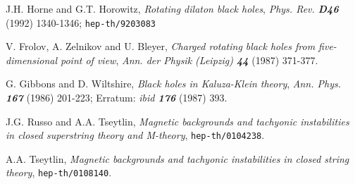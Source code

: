 \documentclass[a4paper,12pt]{article}
\begin{document}
\begin{thebibliography}{99}
    J.H. Horne and G.T. Horowitz,
    {\sl Rotating dilaton black holes},
    {\it Phys. Rev. \bf D46} (1992) 1340-1346;
    {\tt hep-th/9203083}

    V. Frolov, A. Zelnikov and U. Bleyer,
    {\sl Charged rotating black holes from five-dimensional
         point of view},
    {\it Ann. der Physik (Leipzig) \bf 44} (1987) 371-377.

    G. Gibbons and D. Wiltshire,
    {\sl Black holes in Kaluza-Klein theory},
    {\it Ann. Phys. \bf 167} (1986) 201-223;
    Erratum: {\it ibid \bf 176} (1987) 393.

    J.G. Russo and A.A. Tseytlin,
    {\sl Magnetic backgrounds and tachyonic instabilities in
         closed superstring theory and M-theory},
    {\tt hep-th/0104238}.

    A.A. Tseytlin,
    {\sl Magnetic backgrounds and tachyonic instabilities in
         closed string theory},
    {\tt hep-th/0108140}.

\end{thebibliography}
\end{document}
